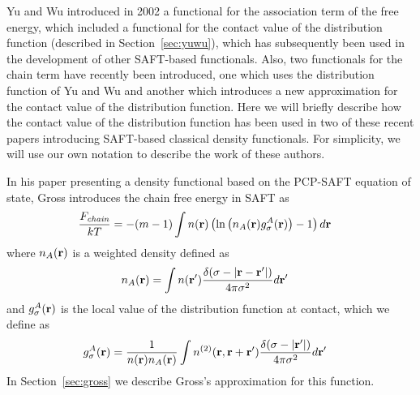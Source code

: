 Yu and Wu introduced in 2002 a functional for the association term of
the free energy, which included a functional for the contact value of
the distribution function (described in
Section~\ref{sec:yuwu})\cite{yu2002fmt-dft-inhomogeneous-associating},
which has subsequently been used in the development of other
SAFT-based functionals\cite{fu2005vapor-liquid-dft, bryk2006density}.
Also, two functionals for the chain term have recently been
introduced, one which uses the
distribution function of Yu and Wu\cite{bryk2006density} and another which
introduces a new approximation for the contact value of the
distribution function\cite{gross2009density}.
Here we will briefly describe how the contact value of the distribution
function has been used in two of these recent papers introducing
SAFT-based classical density functionals.  For simplicity, we will use
our own notation to describe the work of these authors.

In his paper
presenting a density functional based on the PCP-SAFT equation of
state\cite{gross2009density}, Gross introduces the chain free energy
in SAFT as
\begin{align}
  \frac{F_\textit{chain}}{kT} &= -(m-1) \int n(\textbf{r}) \left(\ln\left(n_A(\textbf{r})
  g_\sigma^A(\textbf{r}) \right)-1\right) d\textbf{r} \label{eq:Achain}
\end{align}
where $n_A(\textbf{r})$ is a weighted density defined as
\begin{align}
  n_A(\textbf{r}) &= \int n(\textbf{r}')
  \frac{\delta(\sigma -|\textbf{r}-\textbf{r}'|)}{4\pi\sigma^2} d\textbf{r}' \label{eq:nA}
\end{align}
and $g_\sigma^A(\textbf{r})$ is the local value of the distribution function
at contact, which we define as
\begin{align}
  g^A_\sigma(\textbf{r}) &= \frac{1}{n(\textbf{r})n_A(\textbf{r})}
  \int n^{(2)}(\textbf{r}, \textbf{r} + \textbf{r}')
  \frac{\delta(\sigma -|\textbf{r}'|)}{4\pi\sigma^2}d\textbf{r}' \label{eq:gA}
\end{align}
In Section~\ref{sec:gross} we describe Gross's approximation for this
function.

